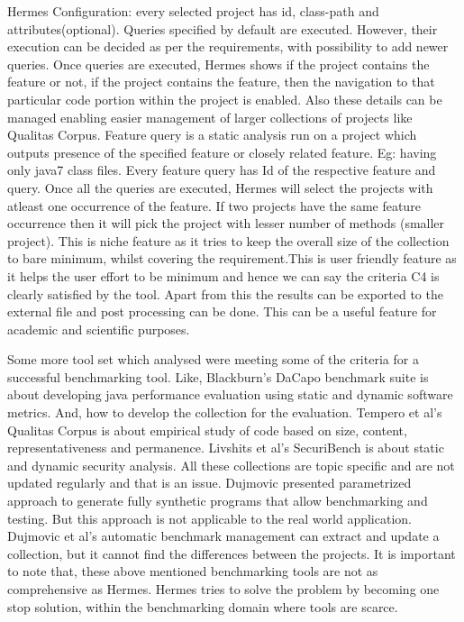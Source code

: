 \documentclass[authoryear,preprint]{sigplanconf}
\begin{document}
Hermes Configuration: every selected project has id, class-path and attributes(optional). Queries specified by default are executed. However, their execution can be decided as per the requirements, with possibility to add newer queries. Once queries are executed, Hermes shows if the project contains the feature or not, if the project contains the feature, then the navigation to that particular code portion within the project is enabled. Also these details can be managed enabling easier management of larger collections of projects like Qualitas Corpus. Feature query is a static analysis run on a project which outputs presence of the specified feature or closely related feature. Eg: having only java7 class files. Every feature query has Id of the respective feature and query. Once all the queries are executed, Hermes will select the projects with atleast one occurrence of the feature. If two projects have the same feature occurrence then it will pick the project with lesser number of methods (smaller project). This is niche feature as it tries to keep the overall size of the collection to bare minimum, whilst covering the requirement.This is user friendly feature as it helps the user effort to be minimum and hence we can say the criteria C4 is clearly satisfied by the tool. Apart from this the results can be exported to the external file and post processing can be done. This can be a useful feature for academic and scientific purposes.

Some more tool set which analysed were meeting some of the criteria for a successful benchmarking tool. Like, Blackburn’s DaCapo benchmark suite\cite{Blackburn:2006:DBJ:1167473.1167488} is about developing java performance evaluation using static and dynamic software metrics. And, how to develop the collection for the evaluation. Tempero et al’s Qualitas Corpus is about empirical study of code based on size, content, representativeness and permanence. Livshits et al’s SecuriBench\cite{Livshits_defininga} is about static and dynamic security analysis. All these collections are topic specific and are not updated regularly and that is an issue. Dujmovic presented parametrized approach to generate fully synthetic programs that allow benchmarking and testing. But this approach is not applicable to the real world application. Dujmovic et al’s automatic benchmark management\cite{Dujmovic:2010:AGB:1712605.1712654} can extract and update a collection, but it cannot find the differences between the projects. It is important to note that, these above mentioned benchmarking tools are not as comprehensive as Hermes. Hermes tries to solve the problem by becoming one stop solution, within the benchmarking domain where tools are scarce.
\end{document}
